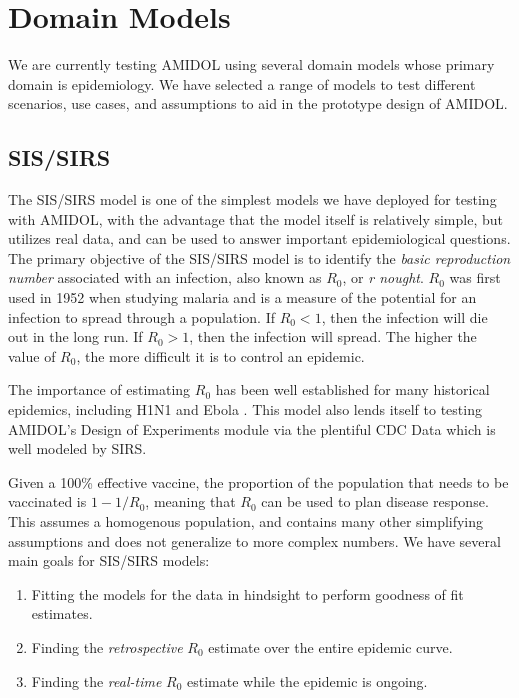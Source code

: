 \documentclass[11pt]{article}
\newcommand{\amidol}{\textsc{AMIDOL}}
\begin{document}
\section{Domain Models}

We are currently testing \amidol{} using several domain models whose primary domain is epidemiology.  We have selected a range of models to test different scenarios, use cases, and assumptions to aid in the prototype design of \amidol{}.

\subsection{SIS/SIRS}

The SIS/SIRS model is one of the simplest models we have deployed for testing with \amidol{}, with the advantage that the model itself is relatively simple, but utilizes real data, and can be used to answer important epidemiological questions.  The primary objective of the SIS/SIRS model is to identify the \emph{basic reproduction number} associated with an infection, also known as $R_0$, or \emph{r nought}.  $R_0$ was first used in 1952 when studying malaria and is a measure of the potential for an infection to spread through a population.  If $R_0 < 1$, then the infection will die out in the long run.  If $R_0 > 1$, then the infection will spread.  The higher the value of $R_0$, the more difficult it is to control an epidemic.

The importance of estimating $R_0$ has been well established for many historical epidemics, including H1N1 \cite{fraser2009pandemic} and Ebola \cite{fisman2014early}.  This model also lends itself to testing \amidol{}'s Design of Experiments module via the plentiful CDC Data \cite{cdc2019fluview} which is well modeled by SIRS.

Given a 100\% effective vaccine, the proportion of the population that needs to be vaccinated is $1 - 1/R_0$, meaning that $R_0$ can be used to plan disease response.  This assumes a homogenous population, and contains many other simplifying assumptions and does not generalize to more complex numbers.  We have several main goals for SIS/SIRS models:

\begin{enumerate}
\item Fitting the models for the data in hindsight to perform goodness of fit estimates.
\item Finding the \emph{retrospective} $R_0$ estimate over the entire epidemic curve.
\item Finding the \emph{real-time} $R_0$ estimate while the epidemic is ongoing.
\end{enumerate}
\end{document}
